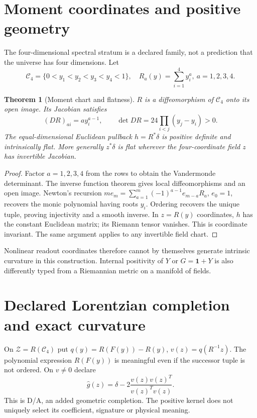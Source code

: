 \documentclass[11pt,letterpaper]{article}
\newcommand{\Id}{\mathbf 1}
\newtheorem{theorem}{Theorem}[section]
\theoremstyle{definition}
\numberwithin{equation}{section}
\begin{document}
\section{Moment coordinates and positive geometry}
The four-dimensional spectral stratum is a declared family, not a prediction that the universe has four dimensions. Let
\begin{equation}
\mathcal C_4=\{0<y_1<y_2<y_3<y_4<1\},\quad
R_a(y)=\sum_{i=1}^4y_i^a,\ a=1,2,3,4.
\end{equation}
\begin{theorem}[Moment chart and flatness]\label{moment}
$R$ is a diffeomorphism of $\mathcal C_4$ onto its open image. Its Jacobian satisfies
\begin{equation}
(DR)_{ai}=ay_i^{a-1},\qquad\det DR=24\prod_{i<j}(y_j-y_i)>0.
\end{equation}
The equal-dimensional Euclidean pullback $h=R^*\delta$ is positive definite and intrinsically flat. More generally $z^*\delta$ is flat wherever the four-coordinate field $z$ has invertible Jacobian.
\end{theorem}
\begin{proof}
Factor $a=1,2,3,4$ from the rows to obtain the Vandermonde determinant. The inverse function theorem gives local diffeomorphisms and an open image. Newton's recursion $me_m=\sum_{a=1}^m(-1)^{a-1}e_{m-a}R_a$, $e_0=1$, recovers the monic polynomial having roots $y_i$. Ordering recovers the unique tuple, proving injectivity and a smooth inverse. In $z=R(y)$ coordinates, $h$ has the constant Euclidean matrix; its Riemann tensor vanishes. This is coordinate invariant. The same argument applies to any invertible field chart.
\end{proof}
Nonlinear readout coordinates therefore cannot by themselves generate intrinsic curvature in this construction. Internal positivity of $Y$ or $G=\Id+Y$ is also differently typed from a Riemannian metric on a manifold of fields.

\section{Declared Lorentzian completion and exact curvature}
On $\mathcal Z=R(\mathcal C_4)$ put $q(y)=R(F(y))-R(y)$, $v(z)=q(R^{-1}z)$. The polynomial expression $R(F(y))$ is meaningful even if the successor tuple is not ordered. On $v\ne0$ declare
\begin{equation}\label{lorentz}
\widehat g(z)=\delta-2\frac{v(z)v(z)^T}{v(z)^Tv(z)}.
\end{equation}
This is D/A, an added geometric completion. The positive kernel does not uniquely select its coefficient, signature or physical meaning.
\end{document}
